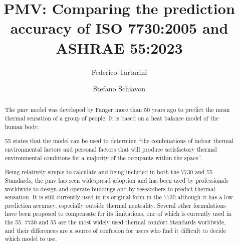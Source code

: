 \begin{frontmatter}

    \title{PMV: Comparing the prediction accuracy of ISO 7730:2005 and ASHRAE 55:2023}

    \author[label1,label2]{Federico Tartarini}
    \author[label3]{Stefano Schiavon}

    \address[label1]{Berkeley Education Alliance for Research in Singapore, Singapore}
    \address[label2]{Heat and Health Research Incubator, Faculty of Health and Medicine, University of Sydney, Sydney, AU}
    \address[label3]{Center for the Built Environment, University of California, Berkeley, CA, USA}


    \begin{abstract}
        The \ac{pmv} model was developed by Fanger more than 50 years ago to predict the mean thermal sensation of a group of people. 
        It is based on a heat balance model of the human body.

        \gls{55} states that the model can be used to determine ``the combinations of indoor thermal environmental factors and personal factors that will produce satisfactory thermal environmental conditions for a majority of the occupants within the space''.

        Being relatively simple to calculate and being included in both the \gls{7730} and \gls{55} Standards, the \ac{pmv} has seen widespread adoption and has been used by professionals worldwide to design and operate buildings and by researchers to predict thermal sensation.
        It is still currently used in its original form in the \gls{7730} although it has a low prediction accuracy, especially outside thermal neutrality.
        Several other formulations have been proposed to compensate for its limitations, one of which is currently used in the \gls{55}.
        \gls{7730} and \gls{55} are the most widely used thermal comfort Standards worldwide, and their differences are a source of confusion for users who find it difficult to decide which model to use.


\end{abstract}
\end{frontmatter}
